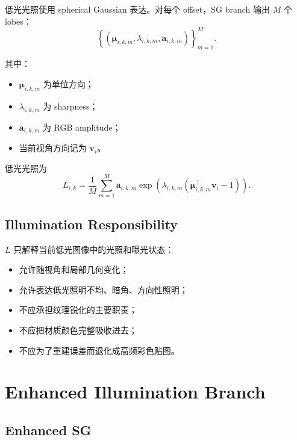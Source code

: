 \documentclass[11pt]{article}
\begin{document}
低光光照使用 spherical Gaussian 表达。对每个 offset，SG branch 输出 $M$ 个 lobes：
\begin{equation}
    \left\{
        \left(
            \bm{\mu}_{i,k,m},
            \lambda_{i,k,m},
            \mathbf{a}_{i,k,m}
        \right)
    \right\}_{m=1}^{M}.
\end{equation}

其中：
\begin{itemize}[leftmargin=1.5em]
    \item $\bm{\mu}_{i,k,m}$ 为单位方向；
    \item $\lambda_{i,k,m}$ 为 sharpness；
    \item $\mathbf{a}_{i,k,m}$ 为 RGB amplitude；
    \item 当前视角方向记为 $\mathbf{v}_{i}$。
\end{itemize}

低光光照为
\begin{equation}
    L_{i,k}
    =
    \frac{1}{M}
    \sum_{m=1}^{M}
    \mathbf{a}_{i,k,m}
    \exp
    \left(
        \lambda_{i,k,m}
        \left(
            \bm{\mu}_{i,k,m}^{\top}\mathbf{v}_{i} - 1
        \right)
    \right).
\end{equation}

\subsection{Illumination Responsibility}

$L$ 只解释当前低光图像中的光照和曝光状态：
\begin{itemize}[leftmargin=1.5em]
    \item 允许随视角和局部几何变化；
    \item 允许表达低光照明不均、暗角、方向性照明；
    \item 不应承担纹理锐化的主要职责；
    \item 不应把材质颜色完整吸收进去；
    \item 不应为了重建误差而退化成高频彩色贴图。
\end{itemize}

\section{Enhanced Illumination Branch}

\subsection{Enhanced SG}
\end{document}
